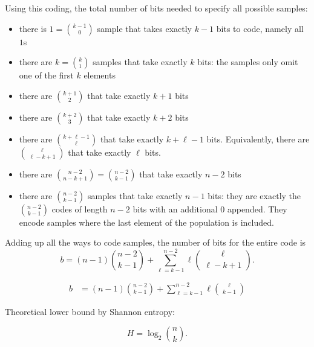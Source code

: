 \documentclass[12pt]{article}
\begin{document}
Using this coding, the total number of bits needed to specify all possible samples:
\begin{itemize}
\item there is  $1 = {{k-1} \choose {0}}$ sample that takes exactly $k-1$ bits to code, namely all $1$s
\item there are $k = {{k} \choose {1}}$ samples that take exactly $k$ bits: the samples only omit one of the first $k$ elements
\item there are ${{k+1} \choose 2} $ that take exactly $k+1$ bits
\item there are $ {{k+2} \choose 3} $ that take exactly $k+2$ bits
\item there are $ {{k+\ell-1} \choose {\ell}} $ that take exactly $k+\ell-1$ bits. Equivalently, there are ${{\ell} \choose {\ell - k + 1}}$ that take exactly $\ell$ bits.
\item there are $ {{n-2} \choose {n - k+1}} = {{n-2} \choose {k-1}} $ that take exactly $n-2$ bits
\item there are $ {{n-2} \choose {k-1}} $ samples that take exactly $n-1$ bits: they are exactly the $ {{n-2} \choose {k-1}} $ codes of length $n-2$ bits with an additional $0$ appended. They encode samples where the last element of the population is included.
\end{itemize}
Adding up all the ways to code samples, the number of bits for the entire code is
$$ b = (n-1)  {{n-2} \choose {k-1}} + \sum_{\ell=k-1}^{n-2} \ell {{\ell} \choose {\ell-k+1}}.$$

\begin{align*}
 b &= (n-1)  {{n-2} \choose {k-1}} + \sum_{\ell=k-1}^{n-2} \ell {{\ell} \choose {k-1}}
\end{align*}

Theoretical lower bound by Shannon entropy:

$$ H = \log_2 {{n} \choose {k}}.$$
\end{document}
